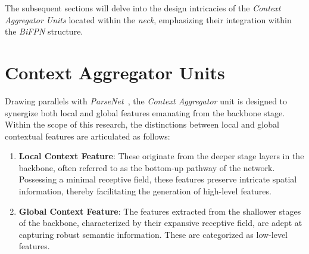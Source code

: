 The subsequent sections will delve into the design intricacies of the \textit{Context Aggregator Units} located within the \textit{neck}, emphasizing their integration within the \textit{BiFPN} structure.

\section{Context Aggregator Units} \label{sec:cau}
Drawing parallels with \textit{ParseNet}~\cite{DBLP:journals/corr/LiuRB15}, the \textit{Context Aggregator} unit is designed to synergize both local and global features emanating from the backbone stage. Within the scope of this research, the distinctions between local and global contextual features are articulated as follows:
\begin{enumerate}
    \item \textbf{Local Context Feature}: These originate from the deeper stage layers in the backbone, often referred to as the bottom-up pathway of the network. Possessing a minimal receptive field, these features preserve intricate spatial information, thereby facilitating the generation of high-level features.
    \item \textbf{Global Context Feature}: The features extracted from the shallower stages of the backbone, characterized by their expansive receptive field, are adept at capturing robust semantic information. These are categorized as low-level features.
\end{enumerate}

